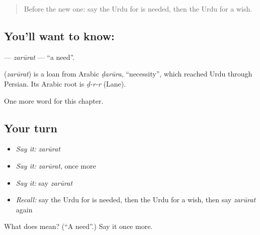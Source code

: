 \label{lesson:UR-C104-zarurat}



\begin{quote}
Before the new one: say the Urdu for is needed, then the Urdu for a wish.
\end{quote}

\subsection*{You'll want to know: }
\textbf{} — \emph{zarūrat} — \textquotedblleft{}a need\textquotedblright{}.

\begin{cousinweb}
\textbf{} (\emph{zarūrat}) is a loan from Arabic \emph{ḍarūra}, \textquotedblleft{}necessity\textquotedblright{}, which reached Urdu through Persian. Its Arabic root is \emph{ḍ-r-r} (Lane).
\end{cousinweb}

\begin{grammarlens}[title={What you've built}]
One more word for this chapter.
\end{grammarlens}

\subsection*{Your turn}
\begin{itemize}
\raggedright
  \item \emph{Say it:} \emph{zarūrat}
  \item \emph{Say it:} \emph{zarūrat}, once more
  \item \emph{Say it:} say \emph{zarūrat}
  \item \emph{Recall:} say the Urdu for is needed, then the Urdu for a wish, then say \emph{zarūrat} again
\end{itemize}

\begin{tcolorbox}[breakable,colback=teal!4,colframe=teal!35!black,title={Before you move on}]
What does  mean? (\textquotedblleft{}A need\textquotedblright{}.) Say it once more.
\end{tcolorbox}
